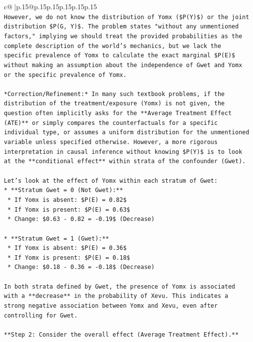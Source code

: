 \documentclass{article}
\begin{document}
{\begin{supertabular}{c@{$\;$}|p{.15\linewidth}@{}p{.15\linewidth}p{.15\linewidth}p{.15\linewidth}p{.15\linewidth}p{.15\linewidth}}
{{{\\ 
\texttt{However, we do not know the distribution of Yomx (\$P(Y)\$) or the joint distribution \$P(G, Y)\$. The problem states "without any unmentioned factors," implying we should treat the provided probabilities as the complete description of the world's mechanics, but we lack the specific prevalence of Yomx to calculate the exact marginal \$P(E)\$ without making an assumption about the independence of Gwet and Yomx or the specific prevalence of Yomx.} \\
\\ 
\texttt{*Correction/Refinement:* In many such textbook problems, if the distribution of the treatment/exposure (Yomx) is not given, the question often implicitly asks for the **Average Treatment Effect (ATE)** or simply compares the counterfactuals for a specific individual type, or assumes a uniform distribution for the unmentioned variable unless specified otherwise. However, a more rigorous interpretation in causal inference without knowing \$P(Y)\$ is to look at the **conditional effect** within strata of the confounder (Gwet).} \\
\\ 
\texttt{Let's look at the effect of Yomx within each stratum of Gwet:} \\
\texttt{*   **Stratum Gwet = 0 (Not Gwet):**} \\
\texttt{    *   If Yomx is absent: \$P(E) = 0.82\$} \\
\texttt{    *   If Yomx is present: \$P(E) = 0.63\$} \\
\texttt{    *   Change: \$0.63 {-} 0.82 = {-}0.19\$ (Decrease)} \\
\\ 
\texttt{*   **Stratum Gwet = 1 (Gwet):**} \\
\texttt{    *   If Yomx is absent: \$P(E) = 0.36\$} \\
\texttt{    *   If Yomx is present: \$P(E) = 0.18\$} \\
\texttt{    *   Change: \$0.18 {-} 0.36 = {-}0.18\$ (Decrease)} \\
\\ 
\texttt{In both strata defined by Gwet, the presence of Yomx is associated with a **decrease** in the probability of Xevu. This indicates a strong negative association between Yomx and Xevu, even after controlling for Gwet.} \\
\\ 
\texttt{**Step 2: Consider the overall effect (Average Treatment Effect).**} \\
}}}
\end{supertabular}}
\end{document}
